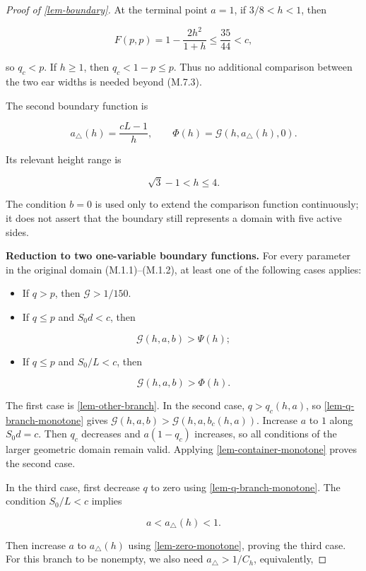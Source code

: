 \documentclass[11pt,a4paper]{article}
\theoremstyle{proofmanuscript}
\providecommand{\tightlist}{\setlength{\itemsep}{0pt}\setlength{\parskip}{0pt}}
\begin{document}
\begin{proof}[Proof of \ref{lem-boundary}]
At the terminal point \(a=1\), if \(3/8<h<1\), then

\[
F(p,p)=1-\frac{2h^2}{1+h}
\le\frac{35}{44}<c,
\]

so \(q_c<p\). If \(h\ge1\), then \(q_c<1-p\le p\). Thus no additional comparison between the two ear widths is needed beyond (M.7.3).

The second boundary function is

\[
a_\triangle(h)=\frac{cL-1}{h},\qquad
\boxed{\Phi(h)=\mathcal G(h,a_\triangle(h),0).}           \tag{M.7.4}
\]

Its relevant height range is

\[
\sqrt3-1<h\le4.                                         \tag{M.7.5}
\]

The condition \(b=0\) is used only to extend the comparison function continuously; it does not assert that the boundary still represents a domain with five active sides.

\textbf{Reduction to two one-variable boundary functions.} For every parameter in the original domain (M.1.1)--(M.1.2), at least one of the following cases applies:

\begin{itemize}
\item
  If \(q>p\), then \(\mathcal G>1/150\).
\item
  If \(q\le p\) and \(S_0d<c\), then
\end{itemize}

\[
  \mathcal G(h,a,b)>\Psi(h);
\]

\begin{itemize}
\tightlist
\item
  If \(q\le p\) and \(S_0/L<c\), then
\end{itemize}

\[
  \mathcal G(h,a,b)>\Phi(h).
\]

The first case is \ref{lem-other-branch}. In the second case, \(q>q_c(h,a)\), so \ref{lem-q-branch-monotone} gives \(\mathcal G(h,a,b)>\mathcal G(h,a,b_c(h,a))\). Increase \(a\) to \(1\) along \(S_0d=c\). Then \(q_c\) decreases and \(a(1-q_c)\) increases, so all conditions of the larger geometric domain remain valid. Applying \ref{lem-container-monotone} proves the second case.

In the third case, first decrease \(q\) to zero using \ref{lem-q-branch-monotone}. The condition \(S_0/L<c\) implies

\[
a<a_\triangle(h)<1.
\]

Then increase \(a\) to \(a_\triangle(h)\) using \ref{lem-zero-monotone}, proving the third case. For this branch to be nonempty, we also need \(a_\triangle>1/C_h\), equivalently,


\end{proof}
\end{document}
